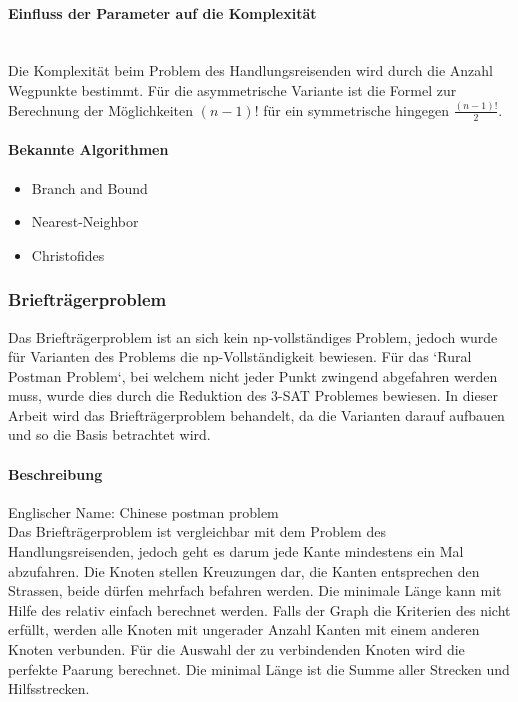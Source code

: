 	\paragraph{Einfluss der Parameter auf die Komplexität}\mbox{}\\
	Die Komplexität beim Problem des Handlungsreisenden wird durch die Anzahl Wegpunkte bestimmt. Für die asymmetrische Variante ist die Formel zur Berechnung der Möglichkeiten $(n-1)!$ 
	für ein symmetrische hingegen $\frac{(n-1)!}{2}$.
	
	 \newpage
	\paragraph{Bekannte Algorithmen}\cite{tsp_algorithmen} \cite{tsp_semesterarbeit} \cite{pomberger2008algorithmen}
	\begin{itemize}
		\item Branch and Bound
		\item Nearest-Neighbor
		\item Christofides
	\end{itemize}

	\subsubsection{Briefträgerproblem}\label{chinese_postman}
	Das Briefträgerproblem ist an sich kein \gls{np}-vollständiges Problem, jedoch wurde für Varianten des Problems die \gls{np}-Vollständigkeit bewiesen. Für das `Rural Postman Problem`, 
	bei welchem nicht jeder Punkt zwingend abgefahren werden muss, wurde dies durch die Reduktion des 3-SAT Problemes bewiesen. In dieser Arbeit wird das Briefträgerproblem behandelt,
	da die Varianten darauf aufbauen und so die Basis betrachtet wird.

	\paragraph{Beschreibung}
	Englischer Name: Chinese postman problem\\
	Das Briefträgerproblem ist vergleichbar mit dem Problem des Handlungsreisenden, jedoch geht es darum jede Kante mindestens ein Mal abzufahren. Die Knoten stellen Kreuzungen dar, 
	die Kanten entsprechen den Strassen, beide dürfen mehrfach befahren werden. Die minimale Länge kann mit Hilfe des  relativ einfach berechnet werden. 
	Falls der Graph die Kriterien des  nicht erfüllt, werden alle Knoten mit ungerader Anzahl Kanten mit einem anderen Knoten verbunden. Für die Auswahl der 
	zu verbindenden Knoten wird die perfekte Paarung berechnet. Die minimal Länge ist die Summe aller Strecken und Hilfsstrecken. \cite{pearson2004decision}

